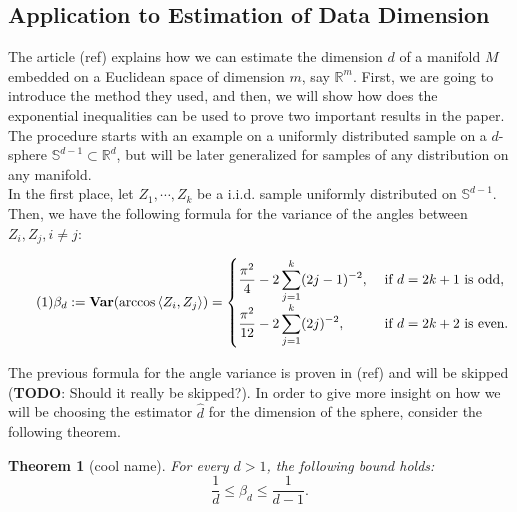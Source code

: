\documentclass[12pt]{exam}
\def\R{\ensuremath{\mathbb{R}}}
\def\S{\ensuremath{\mathbb{S}}}
\def\Var{\ensuremath{\textbf{Var}}}
\newtheorem{theorem}{Theorem}[section]
\theoremstyle{remark}
\newcommand{\angles}[1]{\ensuremath{\left\langle}#1\ensuremath{\right\rangle} }
\begin{document}
\subsection*{Application to Estimation of Data Dimension}
The article (ref) explains how we can estimate the dimension $d$ of a manifold $M$ embedded on a Euclidean space of dimension $m$, say $\R^m$. First, we are going to introduce the method they used, and then, we will show how does the exponential inequalities can be used to prove two important results in the paper. The procedure starts with an example on a uniformly distributed sample on a $d$-sphere $\S^{d-1} \subset \R^d$, but will be later generalized for samples of any distribution on any manifold.\\[4mm]

In the first place, let $Z_1, \cdots, Z_k$ be a i.i.d. sample uniformly distributed on $\S^{d-1}$. Then, we have the following formula for the variance of the angles between $Z_i,Z_j, i\neq j$:

\begin{equation}\label{ade:1}\tag{1}\everymath{\displaystyle}
  \beta_d := \Var(\arccos \angles{Z_i,Z_j}) = \begin{cases}
    \frac{\pi^2}{4} - 2 \sum_{j = 1}^{k} (2j-1)^{-2}, & \mbox{ if } d = 2k+1 \mbox{ is odd},\\
    \frac{\pi^2}{12}- 2 \sum_{j = 1}^{k} (2j)^{-2}, & \mbox{ if } d = 2k+2 \mbox{ is even.}
  \end{cases}
\end{equation}

The previous formula for the angle variance is proven in (ref) and will be skipped (\textbf{TODO}: Should it really be skipped?). In order to give more insight on how we will be choosing the estimator $\widehat{d}$ for the dimension of the sphere, consider the following theorem.

\begin{theorem}[cool name] 
  For every $d > 1$, the following bound holds:
  \[ \frac{1}{d} \leq \beta_d \leq \frac{1}{d-1}. \] 
\end{theorem}
\end{document}
